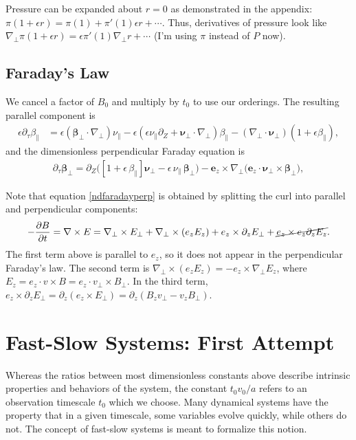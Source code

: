 \documentclass{article}
\newcommand{\para}{\parallel}
\newcommand{\ep}{\epsilon}
\newcommand{\np}{\nabla_\perp}
\newcommand{\p}{\partial}
\newcommand{\deriv}[2]{\frac{\p #1}{\p #2}}
\newcommand{\pth} [1] {\left( #1 \right) }
\begin{document}
Pressure can be expanded about $r=0$ as demonstrated in the appendix: $\pi\pth{1+\ep r} = \pi(1) + \pi'(1)\ep r + \cdots$. Thus, derivatives of pressure look like $\np\pi\pth{1+\ep r} = \ep\pi'(1)\np r + \cdots$ (I'm using $\pi$ instead of $P$ now). 

\subsection{Faraday's Law}
We cancel a factor of $B_0$ and multiply by $t_0$ to use our orderings. The resulting parallel component is 
\begin{align} \label{ndfaradaypara}
    \ep\p_\tau\beta_\para &= \ep\pth{\bm{\beta}_\perp\cdot\np} \nu_\para - \ep\pth{\ep\nu_\para\p_Z + \bm{\nu}_\perp\cdot\np} \beta_\para - \pth{\np\cdot\bm{\nu}_\perp}(1+\ep \beta_\para),
\end{align}
and the dimensionless perpendicular Faraday equation is
\begin{align} \label{ndfaradayperp}
\partial_\tau\bm{\beta}_\perp = \partial_Z\bigg([1+\epsilon\,\beta_\parallel]\bm{\nu}_\perp - \epsilon\,\nu_\parallel\,\bm{\beta}_\perp\bigg) - \bm{e}_z\times\np\bigg(\bm{e}_z\cdot\bm{\nu}_\perp\times\bm{\beta}_\perp\bigg),
\end{align}

Note that equation \eqref{ndfaradayperp} is obtained by splitting the curl into parallel and perpendicular components:  
\begin{align} \label{curldecomp}
    -\deriv{B}{t} = \nabla\times E = \np \times E_\perp + \np\times (e_zE_z) + e_z\times \p_zE_\perp + \cancel{e_z\times e_z\p_z E_z}. 
\end{align} 
The first term above is parallel to $e_z$, so it does not appear in the perpendicular Faraday's law. The second term is $\np \times (e_zE_z) = - e_z\times\np E_z$, where $E_z = e_z\cdot v\times B = e_z\cdot v_\perp \times B_\perp$. In the third term, $e_z\times \p_zE_\perp = \p_z(e_z\times E_\perp) = \p_z (B_zv_\perp - v_zB_\perp)$. 


\section{Fast-Slow Systems: First Attempt}
Whereas the ratios between most dimensionless constants above describe intrinsic properties and behaviors of the system, the constant $t_0v_0/a$ refers to an observation timescale $t_0$ which we choose. Many dynamical systems have the property that in a given timescale, some variables evolve quickly, while others do not. The concept of fast-slow systems is meant to formalize this notion. 
\end{document}
